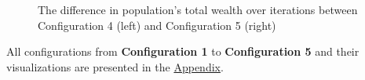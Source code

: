 \documentclass[english]{projectreport}
\begin{document}
\begin{figure}[H]
\begin{center}
%
\end{center}
\caption{The difference in population's total wealth over iterations between Configuration 4 (left) and Configuration 5 (right)}
\end{figure}

\vspace{5mm}

All configurations from \textbf{Configuration 1} to \textbf{Configuration 5} and their visualizations are presented in the \hyperref[sec:appendix]{Appendix}.






\end{document}
